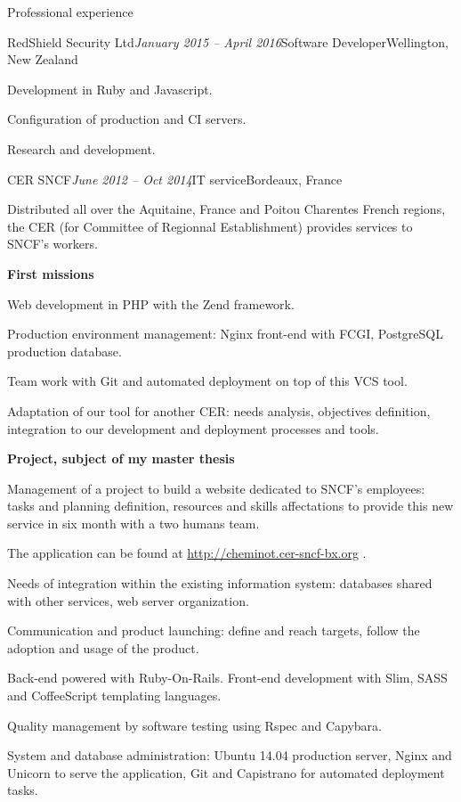 \begin{rSection}{Professional experience}

  \begin{rSubsection}{RedShield Security Ltd}{\em January 2015 -- April 2016}{Software Developer}{Wellington, New Zealand}
    \item[] Development in Ruby and Javascript.
    \item[] Configuration of production and CI servers.
    \item[] Research and development.
  \end{rSubsection}



  \begin{rSubsection}{CER SNCF}{\em June 2012 -- Oct 2014}{IT service}{Bordeaux, France}
    \item[] Distributed all over the Aquitaine, France and Poitou Charentes French regions, the CER (for Committee of Regionnal Establishment) provides services to SNCF's workers.

    \textbf{First missions}
      \item Web development in PHP with the Zend framework.
      \item Production environment management: Nginx front-end with FCGI, PostgreSQL production database.
      \item Team work with Git and automated deployment on top of this VCS tool.
      \item Adaptation of our tool for another CER: needs analysis, objectives definition, integration to our development and deployment processes and tools.

    \textbf{Project, subject of my master thesis}
      \item Management of a project to build a website dedicated to SNCF's employees: tasks and planning definition, resources and skills affectations to provide this new service in six month with a two humans team.
      \item The application can be found at \href{http://cheminot.cer-sncf-bx.org}{http://cheminot.cer-sncf-bx.org} .
      \item Needs of integration within the existing information system: databases shared with other services, web server organization.
      \item Communication and product launching: define and reach targets, follow the adoption and usage of the product.
      \item Back-end powered with Ruby-On-Rails. Front-end development with Slim, SASS and CoffeeScript templating languages.
      \item Quality management by software testing using Rspec and Capybara.
      \item System and database administration: Ubuntu 14.04 production server, Nginx and Unicorn to serve the application, Git and Capistrano for automated deployment tasks.


\end{rSubsection}
\end{rSection}
